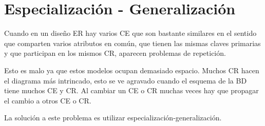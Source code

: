 \documentclass[12pt,a4paper]{report}
\begin{document}
	\section{Especialización - Generalización}
		Cuando en un diseño ER hay varios CE que son bastante similares en el sentido que comparten varios atributos en común, que tienen las mismas claves primarias y que participan en los mismos CR, aparecen problemas de repetición.		
		\par Esto es malo ya que estos modelos ocupan demasiado espacio. Muchos CR hacen el diagrama más intrincado, esto se ve agravado cuando el esquema de la BD tiene muchos CE y CR. Al cambiar un CE o CR muchas veces hay que propagar el cambio a otros CE o CR.
		
		\vspace{5mm}
		\par La solución a este problema es utilizar especialización-generalización.
\end{document}
